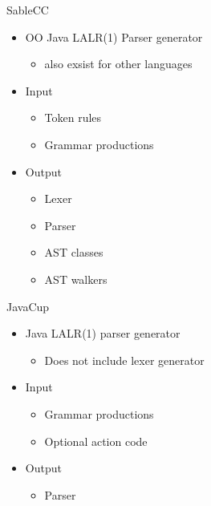 \begin{frame}{SableCC}
  \begin{itemize}
    \item OO Java LALR(1) Parser generator
    \begin{itemize}
      \item also exsist for other languages
    \end{itemize}
    \item Input
    \begin{itemize}
      \item Token rules
      \item Grammar productions
    \end{itemize}
    \item Output
    \begin{itemize}
      \item Lexer
      \item Parser
      \item AST classes
      \item AST walkers
    \end{itemize}
  \end{itemize}
\end{frame}

\begin{frame}{JavaCup}
  \begin{itemize}
    \item Java LALR(1) parser generator
    \begin{itemize}
      \item Does not include lexer generator
    \end{itemize}
    \item Input
    \begin{itemize}
      \item Grammar productions
      \item Optional action code
    \end{itemize}
    \item Output
    \begin{itemize}
      \item Parser
    \end{itemize}
  \end{itemize}
\end{frame}

